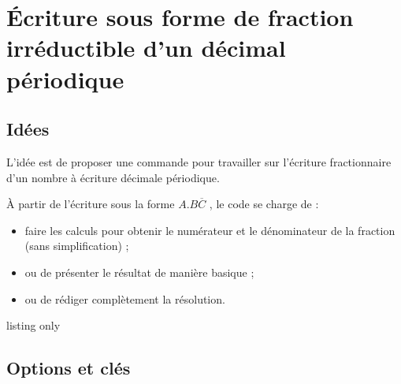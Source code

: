 \newpage

\section{Écriture sous forme de fraction irréductible d'un décimal périodique}\label{fracperiod}

\subsection{Idées}

\begin{tipblock}
 L'idée est de proposer une commande pour travailler sur l'écriture fractionnaire d'un nombre à écriture décimale périodique.

\smallskip

À partir de l'écriture sous la forme \og $A.B\overline{C}$ \fg, le code se charge de :

\begin{itemize}
	\item faire les calculs pour obtenir le numérateur et le dénominateur de la fraction (sans simplification) ;
	\item ou de présenter le résultat de manière basique ;
	\item ou de rédiger complètement la résolution.
\end{itemize}
\vspace*{-\baselineskip}\leavevmode
\end{tipblock}

\begin{PresCodeTexPL}{listing only}
\end{PresCodeTexPL}

\subsection{Options et clés}


